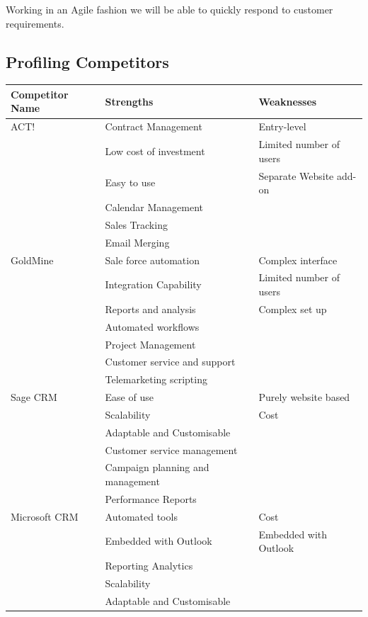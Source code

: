\documentclass[DIV=calc, paper=a4, fontsize=11pt]{scrartcl}	 %
\begin{document}
Working in an Agile fashion we will be able to quickly respond to customer requirements.

\subsection{Profiling Competitors}
\begin{tabular}{|l|p{}|p{}|} \hline
Competitor Name & Strengths & Weaknesses \\ \hline
ACT!     & Contract Management    & Entry-level             \\
         & Low cost of investment & Limited number of users \\
         & Easy to use            & Separate Website add-on \\
         & Calendar Management    &  \\
         & Sales Tracking         &  \\
         & Email Merging          &  \\ \hline
GoldMine & Sale force automation  & Complex interface \\
         & Integration Capability & Limited number of users \\
         & Reports and analysis   & Complex set up \\
         & Automated workflows    &  \\
         & Project Management     &  \\
         & Customer service and support &  \\
         & Telemarketing scripting &  \\ \hline
Sage CRM & Ease of use            & Purely website based \\
         & Scalability            & Cost \\
         & Adaptable and Customisable & \\
         & Customer service management & \\
         & Campaign planning and management & \\
         & Performance Reports    & \\ \hline
Microsoft CRM & Automated tools   & Cost \\
         & Embedded with Outlook  & Embedded with Outlook \\ 
         & Reporting Analytics    &  \\
         & Scalability            &  \\
         & Adaptable and Customisable & \\ \hline
\end{tabular}
\end{document}
